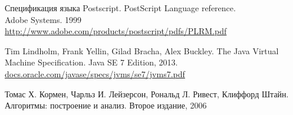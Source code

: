 \documentclass[14pt]{extarticle}
\begin{document}
	
	\begin{thebibliography}{}
		
		Спецификация языка Postscript. PostScript Language reference. \\
		Adobe Systems. 1999\\
		\url{http://www.adobe.com/products/postscript/pdfs/PLRM.pdf}
		
		Tim Lindholm, Frank Yellin, Gilad Bracha, Alex Buckley.
		The Java Virtual Machine Specification.
		Java SE 7 Edition, 2013. \\
		\url{docs.oracle.com/javase/specs/jvms/se7/jvms7.pdf}
		
		Томас Х. Кормен, Чарльз И. Лейзерсон, Рональд Л. Ривест, Клиффорд Штайн.
		Алгоритмы: построение и анализ.
		Второе издание, 2006
		
	\end{thebibliography}
\end{document}
